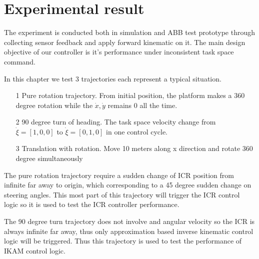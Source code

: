 \chapter{Experimental result}
\label{cha:experiment}
 The experiment is conducted both in simulation and ABB test prototype through collecting sensor feedback and apply forward kinematic on it.
The main design objective of our controller is it's performance under inconsistent task space command.

In this chapter we test 3 trajectories each represent a typical situation. 
\begin{itemize}
    \item[1] Pure rotation trajectory. From initial position, the platform makes a 360 degree rotation while the $\dot{x},\dot{y}$ remains 0 all the time.
    \item[2] 90 degree turn of heading. The task space velocity change from $\dot{\xi}=[1,0,0]$ to $\dot{\xi}=[0,1,0]$ in one control cycle.
    \item[3] Translation with rotation. Move 10 meters along x direction and rotate 360 degree simultaneously
\end{itemize}
The pure rotation trajectory require a sudden change of ICR position from infinite far away to origin, which corresponding to a 45 degree sudden change on steering angles. This most part of this trajectory will trigger the ICR control logic so it is used to test the ICR controller performance.

The 90 degree turn trajectory does not involve and angular velocity so the ICR is always infinite far away, thus only approximation based inverse kinematic control logic will be triggered. Thus this trajectory is used to test the performance of IKAM control logic.

